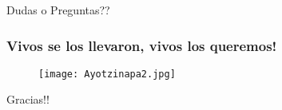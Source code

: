 \documentclass[xcolor=dvipsnames]{beamer}
\begin{document}
\begin{frame}
\begin{centering}
{\Huge{ Dudas o Preguntas??\\

}}

\end{centering}

\end{frame}

\begin{frame}\frametitle{Vivos se los llevaron, vivos los queremos!}

\begin{figure}[H]
\centering
\texttt{[image: Ayotzinapa2.jpg]}
\end{figure}
\end{frame}


\begin{frame}

\begin{centering}
{\Huge{ Gracias!!\\

}}

\end{centering}
\end{frame}
\end{document}
